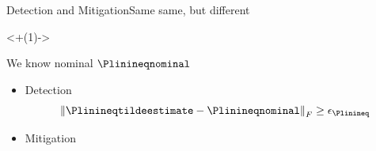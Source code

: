 \documentclass[aspectratio=169]{beamer}
\begin{document}
\begin{frame}{Detection and Mitigation}{Same same, but different}

  \onslide<+(1)->{
    \begin{assumption}
      We know nominal $\Plinineqnominal$
    \end{assumption}
  }

  \begin{itemize}[<+(1)->]
    \item Detection
          \begin{equation*}
            \norm{\Plinineqtildeestimate-\Plinineqnominal}_{F} \geq\epsilon_{\Plinineq}
          \end{equation*}
    \item Mitigation
  \end{itemize}
\end{frame}
\end{document}
